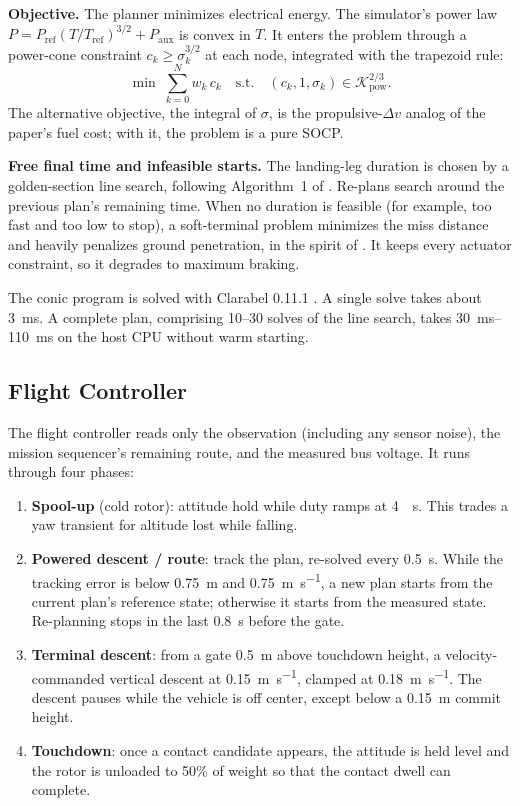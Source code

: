 \documentclass[conference]{IEEEtran}
\begin{document}
\textbf{Objective.} The planner minimizes electrical energy. The simulator's power law $P = P_{\text{ref}}(T/T_{\text{ref}})^{3/2} + P_{\text{aux}}$ is convex in $T$. It enters the problem through a power-cone constraint $c_k \ge \sigma_k^{3/2}$ at each node, integrated with the trapezoid rule:
\begin{equation}
\min \;\sum_{k=0}^{N} w_k\,c_k \quad \text{s.t.} \quad (c_k, 1, \sigma_k) \in \mathcal{K}_{\text{pow}}^{2/3}.
\label{eq:energy_obj}
\end{equation}
The alternative objective, the integral of $\sigma$, is the propulsive-$\Delta v$ analog of the paper's fuel cost; with it, the problem is a pure SOCP.

\textbf{Free final time and infeasible starts.} The landing-leg duration is chosen by a golden-section line search, following Algorithm~1 of \cite{b21}. Re-plans search around the previous plan's remaining time. When no duration is feasible (for example, too fast and too low to stop), a soft-terminal problem minimizes the miss distance and heavily penalizes ground penetration, in the spirit of \cite{b23}. It keeps every actuator constraint, so it degrades to maximum braking.

The conic program is solved with Clarabel 0.11.1 \cite{b24}. A single solve takes about \SI{3}{\milli\second}. A complete plan, comprising 10--30 solves of the line search, takes \SIrange{30}{110}{\milli\second} on the host CPU without warm starting.

\subsection{Flight Controller}
\label{sec:convex_control}

The flight controller reads only the observation (including any sensor noise), the mission sequencer's remaining route, and the measured bus voltage. It runs through four phases:
\begin{enumerate}
    \item \textbf{Spool-up} (cold rotor): attitude hold while duty ramps at \SI{4}{\per\second}. This trades a yaw transient for altitude lost while falling.
    \item \textbf{Powered descent / route}: track the plan, re-solved every \SI{0.5}{\second}. While the tracking error is below \SI{0.75}{\metre} and \SI{0.75}{\metre\per\second}, a new plan starts from the current plan's reference state; otherwise it starts from the measured state. Re-planning stops in the last \SI{0.8}{\second} before the gate.
    \item \textbf{Terminal descent}: from a gate \SI{0.5}{\metre} above touchdown height, a velocity-commanded vertical descent at \SI{0.15}{\metre\per\second}, clamped at \SI{0.18}{\metre\per\second}. The descent pauses while the vehicle is off center, except below a \SI{0.15}{\metre} commit height.
    \item \textbf{Touchdown}: once a contact candidate appears, the attitude is held level and the rotor is unloaded to 50\% of weight so that the contact dwell can complete.
\end{enumerate}
\end{document}
